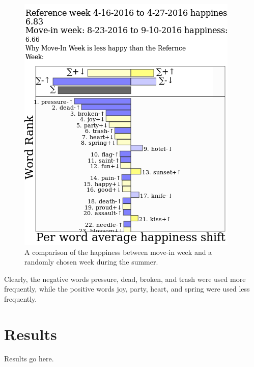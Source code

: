 \documentclass[journal, a4paper]{IEEEtran}
\begin{document}
    \begin{figure}[!hbt]
        \begin{center}
        \includegraphics[width=\columnwidth]{wordshift0}
        \caption{A comparison of the happiness between move-in week and a randomly chosen week during the summer.}
        \label{fig:wordshift0}
        \end{center}
    \end{figure}
    Clearly, the negative words pressure, dead, broken, and trash were used more frequently, while the positive words joy, party, heart, and spring were used less frequently. 
\section{Results}
Results go here.
\end{document}
